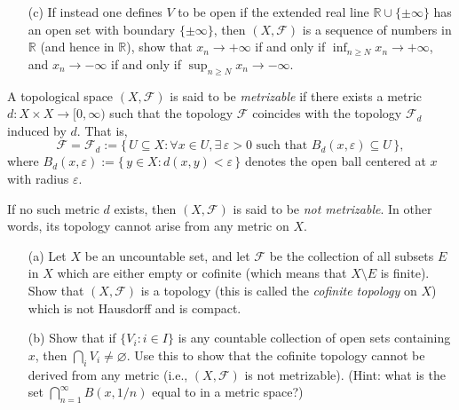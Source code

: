 \begin{problem}[20pts]
\begin{enumerate}
 
 \medskip
\item[(c)] If instead one defines $V$ to be open if the extended real line $\mathbb{R} \cup \{\pm \infty\}$ has an open set with boundary $\{\pm \infty\}$, then $(X, \mathcal{F})$ is a sequence of numbers in $\mathbb{R}$ (and hence in $\mathbb{R}$), show that $x_n \to +\infty$ if and only if $\inf_{n \geq N} x_n \to +\infty$, and $x_n \to -\infty$ if and only if $\sup_{n \geq N} x_n \to -\infty$.

  \end{enumerate}
\end{problem}
\begin{problem}[15pts]
    \vphantom{text}
    \begin{definition}\label{def:metrizable}
A topological space $(X,\mathcal{F})$ is said to be \emph{metrizable} if there exists a metric $d : X \times X \to [0,\infty)$ such that the topology $\mathcal{F}$ coincides with the topology $\mathcal{F}_d$ induced by $d$.  
That is,
\[
\mathcal{F} = \mathcal{F}_d := \{\, U \subseteq X : \forall x \in U, \exists\, \varepsilon > 0 \text{ such that } B_d(x,\varepsilon) \subseteq U \,\},
\]
where $B_d(x,\varepsilon) := \{\, y \in X : d(x,y) < \varepsilon \,\}$ denotes the open ball centered at $x$ with radius $\varepsilon$.

\medskip
If no such metric $d$ exists, then $(X,\mathcal{F})$ is said to be \emph{not metrizable}.  
In other words, its topology cannot arise from any metric on $X$.
\end{definition}

\begin{enumerate}
\item[(a)]  Let $X$ be an uncountable set, and let $\mathcal{F}$ be the collection of all subsets $E$ in $X$ which are either empty or cofinite (which means that $X \setminus E$ is finite).  
Show that $(X, \mathcal{F})$ is a topology (this is called the \emph{cofinite topology} on $X$) which is not Hausdorff  and is compact.  

\item[(b)] 
Show that if $\{V_i : i \in I\}$ is any countable collection of open sets containing $x$, then $\bigcap_i V_i \neq \varnothing$.  
Use this to show that the cofinite topology cannot be derived from any metric (i.e., $(X, \mathcal{F})$ is not metrizable).  
(Hint: what is the set $\bigcap_{n=1}^\infty B(x, 1/n)$ equal to in a metric space?)

\end{enumerate}
\end{problem}
